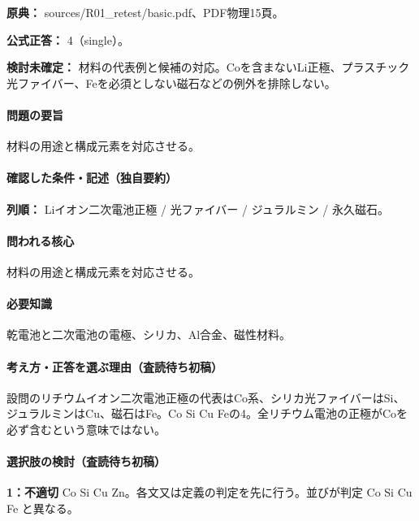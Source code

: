 \noindent\textbf{原典：} sources/R01\_retest/basic.pdf、PDF物理15頁。

\textbf{公式正答：} 4（single）。

\par\textbf{検討未確定：} 材料の代表例と候補の対応。Coを含まないLi正極、プラスチック光ファイバー、Feを必須としない磁石などの例外を排除しない。

\paragraph{問題の要旨} 材料の用途と構成元素を対応させる。

\paragraph{確認した条件・記述（独自要約）}\mbox{}\par

\noindent\textbf{列順：} Liイオン二次電池正極 / 光ファイバー / ジュラルミン / 永久磁石。\par

\paragraph{問われる核心} 材料の用途と構成元素を対応させる。

\paragraph{必要知識} 乾電池と二次電池の電極、シリカ、Al合金、磁性材料。

\paragraph{考え方・正答を選ぶ理由（査読待ち初稿）} 設問のリチウムイオン二次電池正極の代表はCo系、シリカ光ファイバーはSi、ジュラルミンはCu、磁石はFe。Co Si Cu Feの4。全リチウム電池の正極がCoを必ず含むという意味ではない。

\paragraph{選択肢の検討（査読待ち初稿）}\mbox{}\par

\noindent\textbf{1：不適切} Co Si Cu Zn。各文又は定義の判定を先に行う。並びが判定 Co Si Cu Fe と異なる。\par

